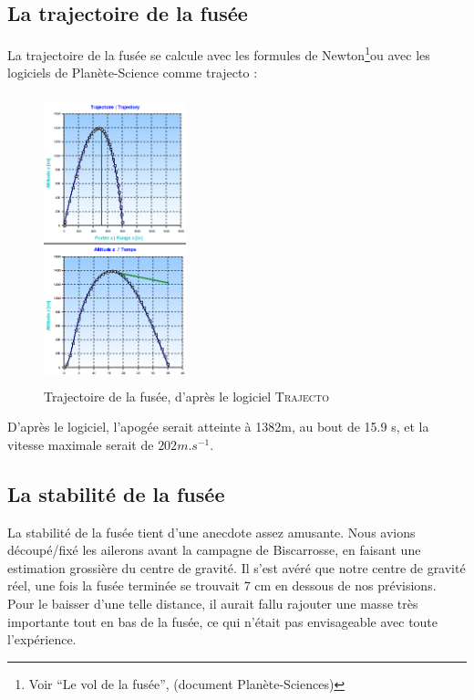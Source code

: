 \documentclass[a4paper,12pt]{scrartcl}
\begin{document}
	  \subsection{La trajectoire de la fusée}
	      La trajectoire de la fusée se calcule avec les formules de Newton\footnote{Voir ``Le vol de la fusée'', (document Planète-Sciences)}ou avec les logiciels de Planète-Science comme trajecto : 
	      \begin{figure}[H]
		    \begin{center}
		      \caption{ Trajectoire de la fusée, d'après le logiciel \textsc{Trajecto}}
		      \includegraphics[height=316px, width=156px]{Photos_Mercury/courbe-trajectoire.png}
		    \end{center}
	      \end{figure}
	      D'après le logiciel, l'apogée serait atteinte à 1382m, au bout de 15.9 s, et la vitesse maximale serait de $202 m.s^{-1}$.
	  \subsection{La stabilité de la fusée}
	      
	    La stabilité de la fusée tient d'une anecdote assez amusante. Nous avions découpé/fixé les ailerons avant la campagne de Biscarrosse, en faisant une estimation grossière du centre de gravité.
	    Il s'est avéré que notre centre de gravité réel, une fois la fusée terminée se trouvait 7 cm en dessous de nos prévisions. Pour le baisser d'une telle distance, 
	    il aurait fallu rajouter une masse très importante tout en bas de la fusée, ce qui n'était pas envisageable avec toute l'expérience.\\
	    
\end{document}
